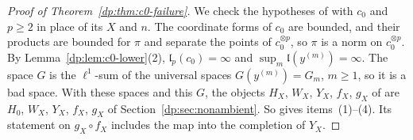 \begin{proof}[Proof of Theorem~\ref{dp:thm:c0-failure}]
We check the hypotheses of \cite[Proposition~14.18]{I} with $c_0$ and $p\ge2$ in place of its $X$ and $n$. The coordinate forms of $c_0$ are bounded, and their products are bounded for $\pi$ and separate the points of $c_0^{\otimes p}$, so $\pi$ is a norm on $c_0^{\otimes p}$. By Lemma~\ref{dp:lem:c0-lower}(2), $\mathfrak l_p(c_0)=\infty$ and $\sup_m\mathfrak l(y^{(m)})=\infty$. The space $G$ is the $\ell^1$-sum of the universal spaces $G(y^{(m)})=G_m$, $m\ge1$, so it is a bad space. With these spaces and this $G$, the objects $H_X$, $W_X$, $Y_X$, $f_X$, $g_X$ of \cite[Definition~14.15]{I} are $H_0$, $W_X$, $Y_X$, $f_X$, $g_X$ of Section~\ref{dp:sec:nonambient}. So \cite[Proposition~14.18]{I} gives items~(1)--(4). Its statement on $g_X\circ f_X$ includes the map into the completion of $Y_X$.
\end{proof}

